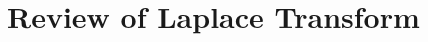 \documentclass[../course]{subfiles}
\begin{document}
\chapter{Review of Laplace Transform} \label{chp:ch06LaplaceTransform}




\end{document}
